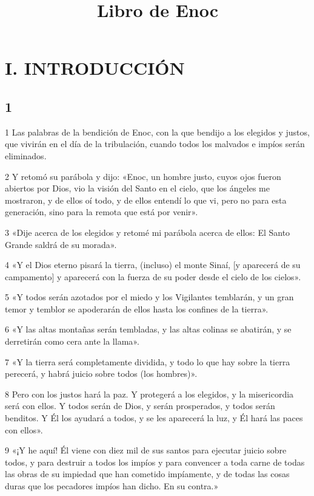 

\title{Libro de Enoc}

\part{I. INTRODUCCIÓN}

\chapter{1}

\par 1 Las palabras de la bendición de Enoc, con la que bendijo a los elegidos y justos, que vivirán en el día de la tribulación, cuando todos los malvados e impíos serán eliminados.
\par 2 Y retomó su parábola y dijo: «Enoc, un hombre justo, cuyos ojos fueron abiertos por Dios, vio la visión del Santo en el cielo, que los ángeles me mostraron, y de ellos oí todo, y de ellos entendí lo que vi, pero no para esta generación, sino para la remota que está por venir».
\par 3 «Dije acerca de los elegidos y retomé mi parábola acerca de ellos: El Santo Grande saldrá de su morada».
\par 4 «Y el Dios eterno pisará la tierra, (incluso) el monte Sinaí, [y aparecerá de su campamento] y aparecerá con la fuerza de su poder desde el cielo de los cielos».
\par 5 «Y todos serán azotados por el miedo y los Vigilantes temblarán, y un gran temor y temblor se apoderarán de ellos hasta los confines de la tierra».
\par 6 «Y las altas montañas serán tembladas, y las altas colinas se abatirán, y se derretirán como cera ante la llama».
\par 7 «Y la tierra será completamente dividida, y todo lo que hay sobre la tierra perecerá, y habrá juicio sobre todos (los hombres)».
\par 8 Pero con los justos hará la paz. Y protegerá a los elegidos, y la misericordia será con ellos. Y todos serán de Dios, y serán prosperados, y todos serán benditos. Y Él los ayudará a todos, y se les aparecerá la luz, y Él hará las paces con ellos».
\par 9 «¡Y he aquí! Él viene con diez mil de sus santos para ejecutar juicio sobre todos, y para destruir a todos los impíos y para convencer a toda carne de todas las obras de su impiedad que han cometido impíamente, y de todas las cosas duras que los pecadores impíos han dicho. En su contra.»

